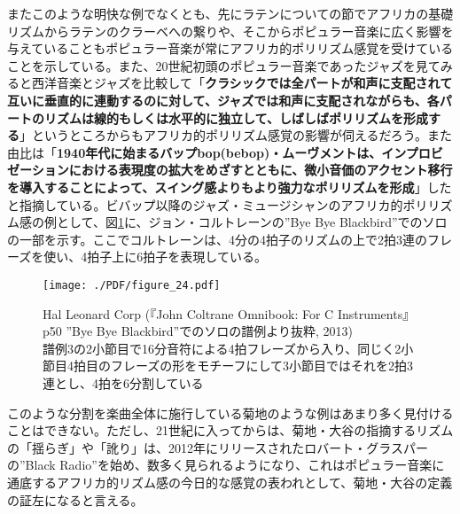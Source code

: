 \documentclass[uplatex,dvipdfmx]{ujarticle}
\begin{document}
またこのような明快な例でなくとも、先にラテンについての節でアフリカの基礎リズムからラテンのクラーベへの繋りや、そこからポピュラー音楽に広く影響を与えていることもポピュラー音楽が常にアフリカ的ポリリズム感覚を受けていることを示している。また、20世紀初頭のポピュラー音楽であったジャズを見てみると西洋音楽とジャズを比較して「{\bf クラシックでは全パートが和声に支配されて互いに垂直的に連動するのに対して、ジャズでは和声に支配されながらも、各パートのリズムは線的もしくは水平的に独立して、しばしばポリリズムを形成する}」\cite{yubi:01}というところからもアフリカ的ポリリズム感覚の影響が伺えるだろう。また由比は「{\bf 1940年代に始まるバップbop(bebop)・ムーヴメントは、インプロビゼーションにおける表現度の拡大をめざすとともに、微小音価のアクセント移行を導入することによって、スイング感よりもより強力なポリリズムを形成}」\cite{yubi:01}したと指摘している。ビバップ以降のジャズ・ミュージシャンのアフリカ的ポリリズム感の例として、図\ref{fig:figure_24}に、ジョン・コルトレーンの''Bye Bye Blackbird''\cite{miles:03}でのソロの一部を示す。ここでコルトレーンは、4分の4拍子のリズムの上で2拍3連のフレーズを使い、4拍子上に6拍子を表現している。

\begin{figure}[ht]
\centerline{
	\texttt{[image: ./PDF/figure\_24.pdf]}
}
\caption{Hal Leonard Corp (『John Coltrane Omnibook: For C Instruments』p50 ''Bye Bye Blackbird''でのソロの譜例より抜粋, 2013)\\
譜例3の2小節目で16分音符による4拍フレーズから入り、同じく2小節目4拍目のフレーズの形をモチーフにして3小節目ではそれを2拍3連とし、4拍を6分割している}
\label{fig:figure_24}
\end{figure}

このような分割を楽曲全体に施行している菊地のような例はあまり多く見付けることはできない。ただし、21世紀に入ってからは、菊地・大谷の指摘するリズムの「揺らぎ」や「訛り」は、2012年にリリースされたロバート・グラスパーの''Black Radio''\cite{Glasper:02}を始め、数多く見られるようになり、これはポピュラー音楽に通底するアフリカ的リズム感の今日的な感覚の表われとして、菊地・大谷の定義の証左になると言える。

%
%
\end{document}
